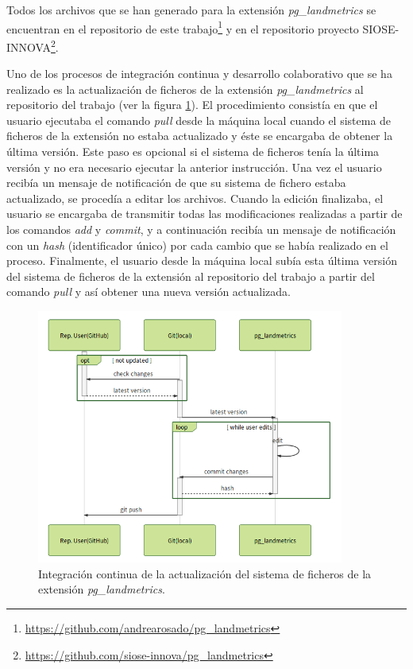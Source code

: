 Todos los archivos que se han generado para la extensión \textit{pg\_landmetrics} se encuentran en el repositorio de este trabajo\footnote{\url{https://github.com/andrearosado/pg_landmetrics}} y en el repositorio proyecto SIOSE-INNOVA\footnote{\url{https://github.com/siose-innova/pg_landmetrics}}.

Uno de los procesos de integración continua y desarrollo colaborativo que se ha realizado es la actualización de ficheros de la extensión \textit{pg\_landmetrics} al repositorio del trabajo (ver la figura \ref{fig:diary}). El procedimiento consistía en que el usuario ejecutaba el comando \textit{pull} desde la máquina local cuando el sistema de ficheros de la extensión no estaba actualizado y éste se encargaba de obtener la última versión. Este paso es opcional si el sistema de ficheros tenía la última versión y no era necesario ejecutar la anterior instrucción. Una vez el usuario recibía un mensaje de notificación de que su sistema de fichero estaba actualizado, se procedía a editar los archivos. Cuando la edición finalizaba, el usuario se encargaba de transmitir todas las modificaciones realizadas a partir de los comandos \textit{add} y \textit{commit}, y a continuación recibía un mensaje de notificación con un \textit{hash} (identificador único) por cada cambio que se había realizado en el proceso. Finalmente, el usuario desde la máquina local subía esta última versión del sistema de ficheros de la extensión al repositorio del trabajo a partir del comando \textit{pull} y así obtener una nueva versión actualizada.

\begin{figure}
\begin{center}
\includegraphics[width=0.9\textwidth]{Metodologia/Figs/diary.png}
\caption{Integración continua de la actualización del sistema de ficheros de la extensión \textit{pg\_landmetrics}. \label{fig:diary}}
\end{center}
\end{figure}

